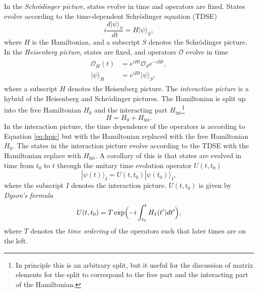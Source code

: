 In the \textit{Schrödinger picture}, states evolve in time and operators are fixed. States evolve according to the time-dependent Schrödinger equation (TDSE)
\begin{equation}
    i\frac{d|\psi\rangle_S}{dt}=H|\psi\rangle_S,
\end{equation}
where $H$ is the Hamiltonian, and a subscript $S$ denotes the Schrödinger picture. In the \textit{Heisenberg picture}, states are fixed, and operators $\mathcal{O}$ evolve in time
\begin{align}\label{eq:hpic}
    \begin{split}
    \mathcal{O}_H(t)&=e^{iHt}\mathcal{O}_Se^{-iHt},\\
    |\psi\rangle_H&=e^{iHt}|\psi\rangle_S,
    \end{split}
\end{align}
where a subscript $H$ denotes the Heisenberg picture. The \textit{interaction picture} is a hybrid of the Heisenberg and Schrödinger pictures. The Hamiltonian is split up into the free Hamiltonian $H_0$ and the interacting part $H_{\text{int}}$\footnote{In principle this is an arbitrary split, but it useful for the discussion of matrix elements for the split to correspond to the free part and the interacting part of the Hamiltonian.}
\begin{equation}
    H=H_0+H_{\text{int}}.
\end{equation}
In the interaction picture, the time dependence of the operators is according to Equation \ref{eq:hpic} but with the Hamiltonian replaced with the free Hamiltonian $H_0$. The states in the interaction picture evolve according to the TDSE with the Hamiltonian replace with $H_{\text{int}}$. A corollary of this is that states are evolved in time from $t_0$ to $t$ through the unitary time evolution operator $U(t,t_0)$
\begin{equation}
    |\psi(t)\rangle_I=U(t,t_0)|\psi(t_0)\rangle_I,
\end{equation}
where the subscript $I$ denotes the interaction picture. $U(t,t_0)$ is given by \textit{Dyson's formula}
\begin{equation}\label{eq:dyson}
    U(t,t_0)=T\exp\Bigl(-i\int_{t_0}^{t}H_I(t')dt'\Bigr),
\end{equation} 
where $T$ denotes the \textit{time ordering} of the operators such that later times are on the left.

